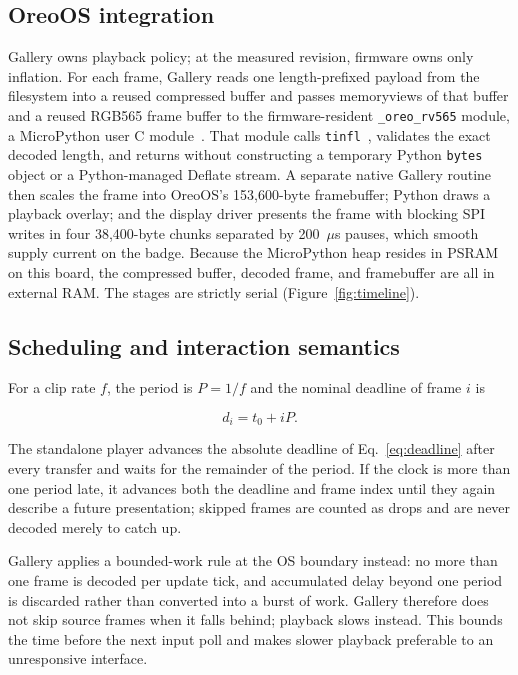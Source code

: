 \documentclass[11pt,twocolumn]{article}
\begin{document}
\subsection{OreoOS integration}

Gallery owns playback policy; at the measured revision, firmware owns only
inflation.  For each frame, Gallery reads one length-prefixed payload from the
filesystem into a reused compressed buffer and passes memoryviews of that
buffer and a reused RGB565 frame buffer to the firmware-resident
\texttt{\_oreo\_rv565} module, a MicroPython user C
module~\cite{micropython}.  That module calls
\texttt{tinfl}~\cite{miniz}, validates the exact decoded length, and returns
without constructing a temporary Python \texttt{bytes} object or a
Python-managed Deflate stream.  A separate native Gallery routine then scales
the frame into OreoOS's 153,600-byte framebuffer; Python draws a playback
overlay; and the display driver presents the frame with blocking SPI writes in
four 38,400-byte chunks separated by 200~$\mu$s pauses, which smooth supply
current on the badge.  Because the MicroPython heap resides in PSRAM on this
board, the compressed buffer, decoded frame, and framebuffer are all in
external RAM.  The stages are strictly serial (Figure~\ref{fig:timeline}).

\subsection{Scheduling and interaction semantics}

For a clip rate $f$, the period is $P=1/f$ and the nominal deadline of frame
$i$ is

\begin{equation}
d_i=t_0+iP.
\label{eq:deadline}
\end{equation}

The standalone player advances the absolute deadline of
Eq.~\eqref{eq:deadline} after every transfer and waits for the remainder of
the period.  If the clock is more than one period late, it advances both the
deadline and frame index until they again describe a future presentation;
skipped frames are counted as drops and are never decoded merely to catch up.

Gallery applies a bounded-work rule at the OS boundary instead: no more than
one frame is decoded per update tick, and accumulated delay beyond one period
is discarded rather than converted into a burst of work.  Gallery therefore
does not skip source frames when it falls behind; playback slows instead.
This bounds the time before the next input poll and makes slower playback
preferable to an unresponsive interface.
\end{document}
